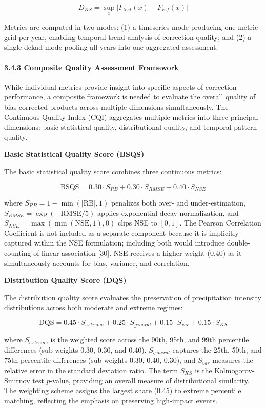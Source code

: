 \documentclass[
]{article}
\begin{document}
\[D_{KS} = \sup_{x} |F_{test}(x) - F_{ref}(x)|\]

Metrics are computed in two modes: (1) a timeseries mode producing one
metric grid per year, enabling temporal trend analysis of correction
quality; and (2) a single-dekad mode pooling all years into one
aggregated assessment.

\paragraph{3.4.3 Composite Quality Assessment
Framework}\label{composite-quality-assessment-framework}

While individual metrics provide insight into specific aspects of
correction performance, a composite framework is needed to evaluate the
overall quality of bias-corrected products across multiple dimensions
simultaneously. The Continuous Quality Index (CQI) aggregates multiple
metrics into three principal dimensions: basic statistical quality,
distributional quality, and temporal pattern quality.

\textbf{Basic Statistical Quality Score (BSQS)}

The basic statistical quality score combines three continuous metrics:

\[\text{BSQS} = 0.30 \cdot S_{RB} + 0.30 \cdot S_{RMSE} + 0.40 \cdot S_{NSE}\]

where \(S_{RB} = 1 - \min(|\text{RB}|, 1)\) penalizes both over- and
under-estimation, \(S_{RMSE} = \exp(-\text{RMSE}/5)\) applies
exponential decay normalization, and
\(S_{NSE} = \max(\min(\text{NSE}, 1), 0)\) clips NSE to \([0, 1]\). The
Pearson Correlation Coefficient is not included as a separate component
because it is implicitly captured within the NSE formulation; including
both would introduce double-counting of linear association {[}30{]}. NSE
receives a higher weight (0.40) as it simultaneously accounts for bias,
variance, and correlation.

\textbf{Distribution Quality Score (DQS)}

The distribution quality score evaluates the preservation of
precipitation intensity distributions across both moderate and extreme
regimes:

\[\text{DQS} = 0.45 \cdot S_{extreme} + 0.25 \cdot S_{general} + 0.15 \cdot S_{var} + 0.15 \cdot S_{KS}\]

where \(S_{extreme}\) is the weighted score across the 90th, 95th, and
99th percentile differences (sub-weights 0.30, 0.30, and 0.40),
\(S_{general}\) captures the 25th, 50th, and 75th percentile differences
(sub-weights 0.30, 0.40, 0.30), and \(S_{var}\) measures the relative
error in the standard deviation ratio. The term \(S_{KS}\) is the
Kolmogorov-Smirnov test \(p\)-value, providing an overall measure of
distributional similarity. The weighting scheme assigns the largest
share (0.45) to extreme percentile matching, reflecting the emphasis on
preserving high-impact events.
\end{document}

